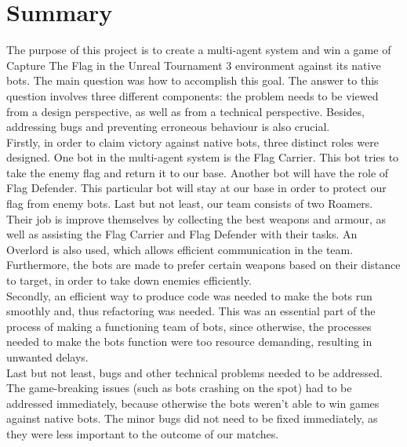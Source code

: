 \chapter*{Summary}
The purpose of this project is to create a multi-agent system and win a game of Capture The Flag in the Unreal Tournament 3 environment against its native bots. The main question was how to accomplish this goal. The answer to this question involves three different components: the problem needs to be viewed from a design perspective, as well as from a technical perspective. Besides, addressing bugs and preventing  erroneous behaviour is also crucial. \\

Firstly, in order to claim victory against native bots, three distinct roles were designed. One bot in the multi-agent system is the Flag Carrier. This bot tries to take the enemy flag and return it to our base. Another bot will have the role of Flag Defender. This particular bot will stay at our base in order to protect our flag from enemy bots. Last but not least, our team consists of two Roamers. Their job is improve themselves by collecting the best weapons and armour, as well as assisting the Flag Carrier and Flag Defender with their tasks. An Overlord is also used, which allows efficient communication in the team. Furthermore, the bots are made to prefer certain weapons based on their distance to target, in order to take down enemies efficiently. \\

Secondly, an efficient way to produce code was needed to make the bots run smoothly and, thus refactoring was needed. This was an essential part of the process of making a functioning team of bots, since otherwise, the processes needed to make the bots function were too resource demanding, resulting in unwanted delays. \\

Last but not least, bugs and other technical problems needed to be addressed. The game-breaking issues (such as bots crashing on the spot) had to be addressed immediately, because otherwise the bots weren't able to win games against native bots. The minor bugs did not need to be fixed immediately, as they were less important to the outcome of our matches. \\